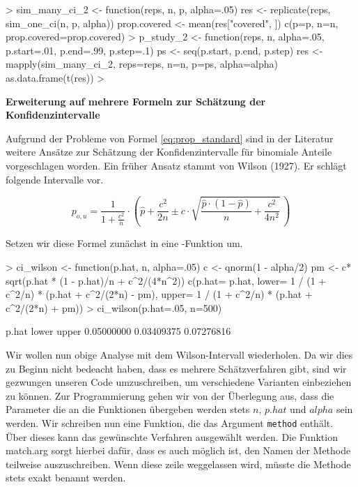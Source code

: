\begin{Schunk}
\begin{Sinput}
> sim_many_ci_2 <- function(reps, n, p, alpha=.05){
   res <- replicate(reps, sim_one_ci(n, p, alpha))
   prop.covered <- mean(res["covered", ])
   c(p=p, n=n, prop.covered=prop.covered)                   
 } 
> p_study_2 <- function(reps, n, alpha=.05,
                       p.start=.01, p.end=.99, p.step=.1){
   ps <- seq(p.start, p.end, p.step)                     
   res <- mapply(sim_many_ci_2, reps=reps,
                 n=n, p=ps, alpha=alpha)   
   as.data.frame(t(res))
 }   
> 
\end{Sinput}
\end{Schunk}

\par
\textbf{Erweiterung auf mehrere Formeln zur Schätzung der Konfidenzintervalle}  

Aufgrund der Probleme von Formel \ref{eq:prop_standard} sind in der Literatur weitere Ansätze zur Schätzung der Konfidenzintervalle für binomiale Anteile vorgeschlagen worden. Ein früher Ansatz stammt von Wilson (1927). Er schlägt folgende Intervalle vor. 

\begin{equation}  \label{eq:ci_wilson}
  p_{o,u} = \frac{1}{1 + \frac{c^2}{n}} \cdot \left(\hat p + \frac{c^2}{2n} \pm c\cdot\sqrt{\frac{\hat p \cdot (1-\hat p)}{n}+\frac{c^2}{4n^2}} \, \right)  
\end{equation}

Setzen wir diese Formel zunächst in eine \R{}-Funktion um.

\begin{Schunk}
\begin{Sinput}
> ci_wilson <- function(p.hat, n, alpha=.05){
   c <- qnorm(1 - alpha/2)
   pm <- c* sqrt(p.hat * (1 - p.hat)/n + c^2/(4*n^2))   
   c(p.hat= p.hat,
     lower= 1 / (1 + c^2/n) * (p.hat + c^2/(2*n) - pm),
     upper= 1 / (1 + c^2/n) * (p.hat + c^2/(2*n) + pm))
 } 
> ci_wilson(p.hat=.05, n=500)
\end{Sinput}
\begin{Soutput}
     p.hat      lower      upper 
0.05000000 0.03409375 0.07276816 
\end{Soutput}
\end{Schunk}

Wir wollen nun obige Analyse mit dem Wilson-Intervall wiederholen. Da wir dies zu Beginn nicht bedeacht haben, dass es mehrere Schätzverfahren gibt, sind wir gezwungen unseren Code umzuschreiben, um verschiedene Varianten einbeziehen zu können. Zur Programmierung gehen wir von der Überlegung aus, dass die Parameter die an die Funktionen übergeben werden stets $n$, $p.hat$ und $alpha$ sein werden. Wir schreiben nun eine Funktion, die das Argument \texttt{method} enthält. Über dieses kann das gewünschte Verfahren ausgewählt werden. Die Funktion match.arg sorgt hierbei dafür, dass es auch möglich ist, den Namen der Methode teilweise auszuschreiben. Wenn diese zeile weggelassen wird, müsste die Methode stets exakt benannt werden.

